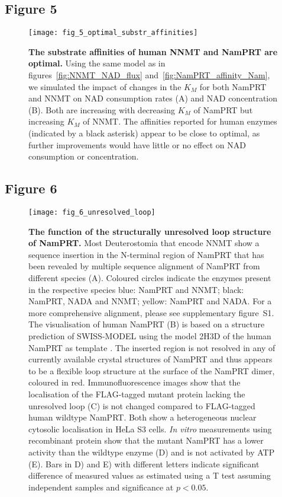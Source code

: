 \newpage


\subsection{Figure 5}

\begin{figure}[ht]
  \centering
  \texttt{[image: fig\_5\_optimal\_substr\_affinities]}
  \caption{\textbf{The substrate affinities of human NNMT and NamPRT are optimal.} Using the same model as in figures~\ref{fig:NNMT_NAD_flux} and~\ref{fig:NamPRT_affinity_Nam}, we simulated the impact of changes in the $K_{M}$ for both NamPRT and NNMT on NAD consumption rates (A) and NAD concentration (B). Both are increasing with decreasing $K_{M}$ of NamPRT but increasing $K_{M}$ of NNMT. The affinities reported for human enzymes (indicated by a black asterisk) appear to be close to optimal, as further improvements would have little or no effect on NAD consumption or concentration.}
  \label{fig:optimal_substr_affinities}
\end{figure}

\newpage


\subsection{Figure 6}

\begin{figure}[ht]
  \centering
  \texttt{[image: fig\_6\_unresolved\_loop]}
  \caption{\textbf{The function of the structurally unresolved loop structure of NamPRT.} Most Deuterostomia that encode NNMT show a sequence insertion in the N-terminal region of NamPRT that has been revealed by multiple sequence alignment of NamPRT from different species (A). Coloured circles indicate the enzymes present in the respective species blue: NamPRT and NNMT; black: NamPRT, NADA and NNMT; yellow: NamPRT and NADA. For a more comprehensive alignment, please see supplementary figure~S1. The visualisation of human NamPRT (B) is based on a structure prediction of SWISS-MODEL \cite{Arnold2006,Biasini2014} using the model 2H3D of the human NamPRT as template \cite{Wang2006}. The inserted region is not resolved in any of currently available crystal structures of NamPRT and thus appears to be a flexible loop structure at the surface of the NamPRT dimer, coloured in red. Immunofluorescence images show that the localisation of the FLAG-tagged mutant protein lacking the unresolved loop (C) is not changed compared to FLAG-tagged human wildtype NamPRT. Both show a heterogeneous nuclear cytosolic localisation in HeLa S3 cells. \textit{In vitro} measurements using recombinant protein show that the mutant NamPRT has a lower activity than the wildtype enzyme (D) and is not activated by ATP (E). Bars in D) and E) with different letters indicate significant difference of measured values as estimated using a T test assuming independent samples and significance at $p < 0.05$.}
  \label{fig:unresolved_loop}
\end{figure}

